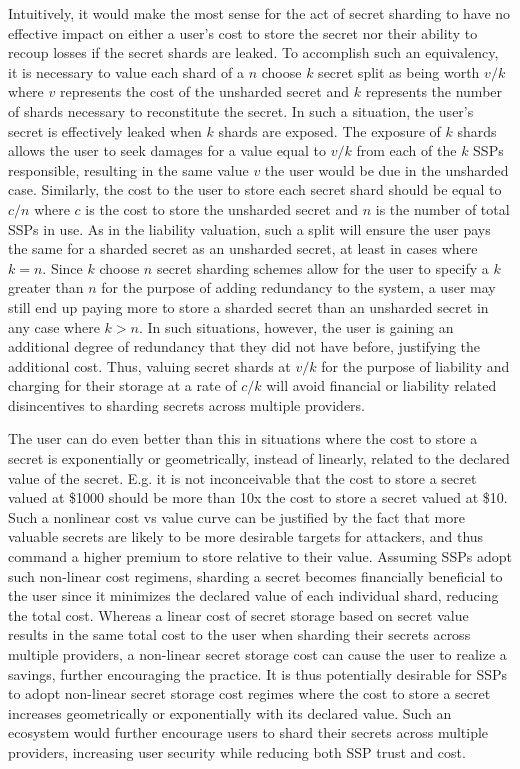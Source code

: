 Intuitively, it would make the most sense for the act of secret
sharding to have no effective impact on either a user's cost to store
the secret nor their ability to recoup losses if the secret shards are
leaked. To accomplish such an equivalency, it is necessary to value
each shard of a $n$ choose $k$ secret split as being worth $v/k$ where
$v$ represents the cost of the unsharded secret and $k$ represents the
number of shards necessary to reconstitute the secret. In such a
situation, the user's secret is effectively leaked when $k$ shards are
exposed. The exposure of $k$ shards allows the user to seek damages
for a value equal to $v/k$ from each of the $k$ SSPs responsible,
resulting in the same value $v$ the user would be due in the unsharded
case. Similarly, the cost to the user to store each secret shard
should be equal to $c/n$ where $c$ is the cost to store the unsharded
secret and $n$ is the number of total SSPs in use. As in the liability
valuation, such a split will ensure the user pays the same for a
sharded secret as an unsharded secret, at least in cases where
$k=n$. Since $k$ choose $n$ secret sharding schemes allow for the user
to specify a $k$ greater than $n$ for the purpose of adding redundancy
to the system, a user may still end up paying more to store a sharded
secret than an unsharded secret in any case where $k>n$. In such
situations, however, the user is gaining an additional degree of
redundancy that they did not have before, justifying the additional
cost. Thus, valuing secret shards at $v/k$ for the purpose of
liability and charging for their storage at a rate of $c/k$ will avoid
financial or liability related disincentives to sharding secrets
across multiple providers.

The user can do even better than this in situations where the cost to
store a secret is exponentially or geometrically, instead of linearly,
related to the declared value of the secret. E.g. it is not
inconceivable that the cost to store a secret valued at \$1000 should
be more than 10x the cost to store a secret valued at \$10. Such a
nonlinear cost vs value curve can be justified by the fact that more
valuable secrets are likely to be more desirable targets for
attackers, and thus command a higher premium to store relative to
their value. Assuming SSPs adopt such non-linear cost regimens,
sharding a secret becomes financially beneficial to the user since it
minimizes the declared value of each individual shard, reducing the
total cost. Whereas a linear cost of secret storage based on secret
value results in the same total cost to the user when sharding their
secrets across multiple providers, a non-linear secret storage cost
can cause the user to realize a savings, further encouraging the
practice. It is thus potentially desirable for SSPs to adopt
non-linear secret storage cost regimes where the cost to store a
secret increases geometrically or exponentially with its declared
value. Such an ecosystem would further encourage users to shard their
secrets across multiple providers, increasing user security while
reducing both SSP trust and cost.

